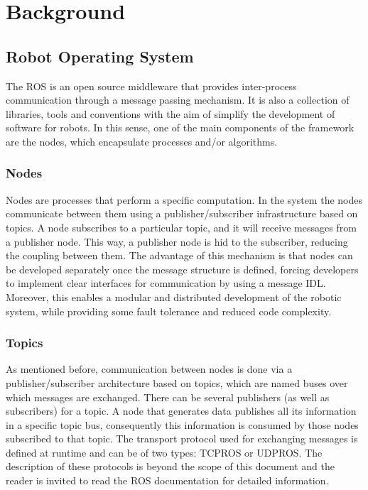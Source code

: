 \cleardoublepage
\chapter{Background}
\label{ch:chapter1}

\section{Robot Operating System}
\label{sec:chapter1:ros}
The \ac{ROS} \nocite{ros-website} is an open source middleware that provides inter-process communication through a message passing mechanism. It is also a collection of libraries, tools and conventions with the aim of simplify the development of software for robots. In this sense, one of the main components of the framework are the nodes, which encapsulate processes and/or algorithms.

\subsection{Nodes}
\label{subsec:chapter1:ros:nodes}
Nodes are processes that perform a specific computation. In the system the nodes communicate between them using a publisher/subscriber infrastructure based on topics. A node subscribes to a particular topic, and it will receive messages from a publisher node. This way, a publisher node is hid to the subscriber, reducing the coupling between them. The advantage of this mechanism is that nodes can be developed separately once the message structure is defined, forcing developers to implement clear interfaces for communication by using a message \ac{IDL}. Moreover, this enables a modular and distributed development of the robotic system, while providing some fault tolerance and reduced code complexity.

\subsection{Topics}
\label{subsec:chapter1:ros:topics}
As mentioned before, communication between nodes is done via a publisher/subscriber architecture based on topics, which are named buses over which messages are exchanged. There can be several publishers (as well as subscribers) for a topic. A node that generates data publishes all its information in a specific topic bus, consequently this information is consumed by those nodes subscribed to that topic. The transport protocol used for exchanging messages is defined at runtime and can be of two types: TCPROS or UDPROS. The description of these protocols is beyond the scope of this document and the reader is invited to read the ROS documentation for detailed information.


